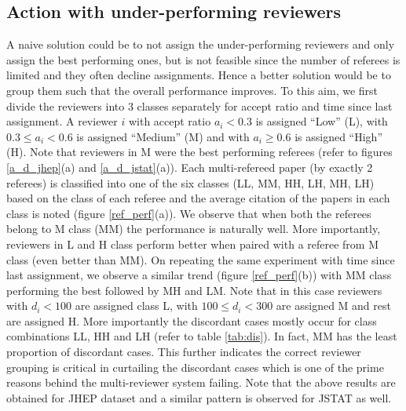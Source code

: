 \subsection{Action with under-performing reviewers}
A naive solution could be to not assign the under-performing reviewers and only assign the best performing ones, but is not feasible 
since the number of referees is limited and they often decline assignments. Hence a better solution would be to group them such that the overall performance improves. 
To this aim, we first divide the reviewers into 3 classes separately for accept ratio and time 
since last assignment. A reviewer $i$ with accept ratio $a_i < 0.3$ is assigned ``Low'' (L), with $0.3 \leq a_i < 0.6$ is assigned ``Medium'' (M) and with $a_i \geq 0.6$ is 
assigned ``High'' (H). Note that reviewers in M were the best performing referees (refer to figures \ref{a_d_jhep}(a) and \ref{a_d_jstat}(a)). Each multi-refereed paper 
(by exactly 2 referees) is classified into one of the six classes (LL, MM, HH, LH, MH, LH) based on the class of each referee and the average citation of the papers in each 
class is noted (figure \ref{ref_perf}(a)). We observe that when both the referees belong to M class (MM) the performance is naturally well. More importantly, reviewers in L and H class 
perform better when paired with a referee from M class (even better than MM). On repeating the same experiment with time since last assignment, 
we observe a similar trend (figure \ref{ref_perf}(b)) with MM class performing the best followed by MH and LM.  
Note that in this case reviewers with $d_i < 100$ are assigned class L, with $100 \leq d_i < 300$ are assigned M and rest are assigned H. 
More importantly the discordant cases mostly occur for 
class combinations LL, HH and LH (refer to table \ref{tab:dis}). In fact, MM has the least proportion of discordant cases. 
This further indicates the correct reviewer grouping is critical in curtailing the discordant cases which is one of the prime reasons behind the multi-reviewer system failing. 
Note that the above results are obtained for JHEP dataset and a similar pattern is observed 
for JSTAT as well.


